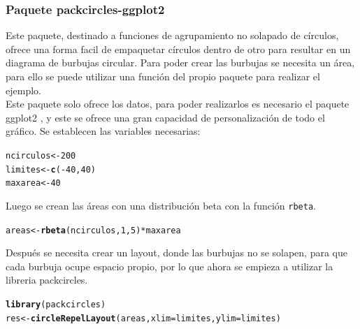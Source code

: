 \documentclass{article}\usepackage[]{graphicx}\usepackage[]{color}
\makeatletter
\newcommand{\hlnum}[1]{\textcolor[rgb]{0.686,0.059,0.569}{#1}}%
\newcommand{\hlopt}[1]{\textcolor[rgb]{0,0,0}{#1}}%
\newcommand{\hlstd}[1]{\textcolor[rgb]{0.345,0.345,0.345}{#1}}%
\newcommand{\hlkwb}[1]{\textcolor[rgb]{0.69,0.353,0.396}{#1}}%
\newcommand{\hlkwc}[1]{\textcolor[rgb]{0.333,0.667,0.333}{#1}}%
\newcommand{\hlkwd}[1]{\textcolor[rgb]{0.737,0.353,0.396}{\textbf{#1}}}%
\newenvironment{kframe}{%
 \def\at@end@of@kframe{}%
 \ifinner\ifhmode%
  \def\at@end@of@kframe{\end{minipage}}%
  \begin{minipage}{\columnwidth}%
 \fi\fi%
 \def\FrameCommand##1{\hskip\@totalleftmargin \hskip-\fboxsep
 \colorbox{shadecolor}{##1}\hskip-\fboxsep
     \hskip-\linewidth \hskip-\@totalleftmargin \hskip\columnwidth}%
 \MakeFramed {\advance\hsize-\width
   \@totalleftmargin\z@ \linewidth\hsize
   \@setminipage}}%
 {\par\unskip\endMakeFramed%
 \at@end@of@kframe}
\newenvironment{knitrout}{}{} %
\makeatother
\begin{document}
\subsubsection{Paquete packcircles-ggplot2}
Este paquete, \cite{docu_packcircles} 
destinado a funciones de agrupamiento no solapado de c\'irculos, ofrece una forma facil de empaquetar c\'irculos dentro de otro para resultar en un diagrama de burbujas circular.
Para poder crear las burbujas se necesita un \'area, para ello se puede utilizar una funci\'on del propio paquete para realizar el ejemplo.~\\
Este paquete solo ofrece los datos, para poder realizarlos es necesario el paquete ggplot2 \cite{docu_ggplot2}
, y este se ofrece una gran capacidad de personalizaci\'on de todo el gr\'afico.
Se establecen las variables necesarias:
\begin{knitrout}
\color{fgcolor}\begin{kframe}
\begin{alltt}
\hlstd{ncirculos} \hlkwb{<-} \hlnum{200}
\hlstd{limites} \hlkwb{<-} \hlkwd{c}\hlstd{(}\hlopt{-}\hlnum{40} \hlstd{,} \hlnum{40}\hlstd{)}
\hlstd{maxarea} \hlkwb{<-} \hlnum{40}
\end{alltt}
\end{kframe}
\end{knitrout}
Luego se crean las \'areas con una distribuci\'on beta con la funci\'on \texttt{rbeta}.
\begin{knitrout}
\color{fgcolor}\begin{kframe}
\begin{alltt}
\hlstd{areas} \hlkwb{<-} \hlkwd{rbeta}\hlstd{(ncirculos,} \hlnum{1}\hlstd{,} \hlnum{5}\hlstd{)} \hlopt{*} \hlstd{maxarea}
\end{alltt}
\end{kframe}
\end{knitrout}
Despu\'es se necesita crear un layout, donde las burbujas no se solapen, para que cada burbuja ocupe espacio propio, por lo que ahora se empieza a utilizar la libreria packcircles.
\begin{knitrout}
\color{fgcolor}\begin{kframe}
\begin{alltt}
\hlkwd{library}\hlstd{(packcircles)}
\hlstd{res} \hlkwb{<-} \hlkwd{circleRepelLayout}\hlstd{(areas,} \hlkwc{xlim} \hlstd{= limites,} \hlkwc{ylim} \hlstd{= limites)}
\end{alltt}
\end{kframe}
\end{knitrout}
\end{document}

